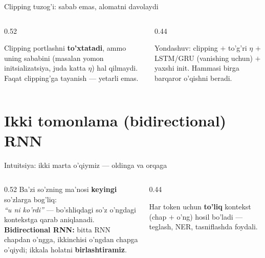 \documentclass[aspectratio=169,11pt]{beamer}
\begin{document}
\begin{frame}{Clipping tuzog'i: sabab emas, alomatni davolaydi}
  \begin{columns}[T]
    \begin{column}{0.52\textwidth}
      \begin{tcolorbox}[warnbox,title=Cheklov]
        \small
        Clipping portlashni \textbf{to'xtatadi}, ammo uning sababini (masalan yomon
        initsializatsiya, juda katta $\eta$) hal qilmaydi. Faqat clipping'ga
        tayanish --- yetarli emas.
      \end{tcolorbox}
    \end{column}
    \begin{column}{0.44\textwidth}
      \begin{tcolorbox}[okbox,top=2pt,bottom=2pt]
        \footnotesize
        Yondashuv: clipping $+$ to'g'ri $\eta$ $+$ LSTM/GRU (vanishing uchun) $+$
        yaxshi init. Hammasi birga barqaror o'qishni beradi.
      \end{tcolorbox}
    \end{column}
  \end{columns}
\end{frame}

\section[Bidirectional]{Ikki tomonlama (bidirectional) RNN}

\begin{frame}{Intuitsiya: ikki marta o'qiymiz --- oldinga va orqaga}
  \begin{columns}[T]
    \begin{column}{0.52\textwidth}
      \small
      Ba'zi so'zning ma'nosi \textbf{keyingi} so'zlarga bog'liq:\\[3pt]
      \textit{``u \underline{\hspace{0.6cm}} ni ko'rdi''} --- bo'shliqdagi so'z o'ngdagi
      kontekstga qarab aniqlanadi.\\[6pt]
      \textbf{Bidirectional RNN:} bitta RNN chapdan o'ngga, ikkinchisi o'ngdan chapga
      o'qiydi; ikkala holatni \textbf{birlashtiramiz}.
    \end{column}
    \begin{column}{0.44\textwidth}
      \begin{tcolorbox}[okbox,top=2pt,bottom=2pt]
        \footnotesize
        Har token uchun \textbf{to'liq} kontekst (chap $+$ o'ng) hosil bo'ladi ---
        teglash, NER, tasniflashda foydali.
      \end{tcolorbox}
    \end{column}
  \end{columns}
\end{frame}
\end{document}
